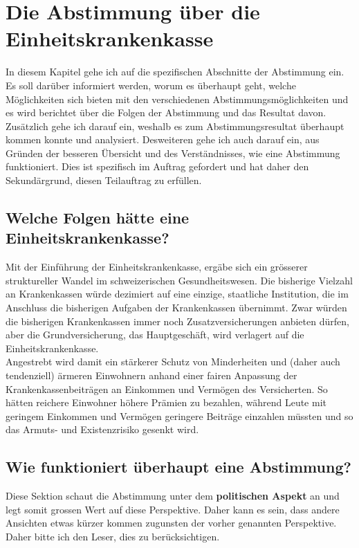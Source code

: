 \documentclass[a4paper,12pt]{book}
\begin{document}
\newpage

\chapter{Die Abstimmung über die Einheitskrankenkasse}
In diesem Kapitel gehe ich auf die spezifischen Abschnitte der Abstimmung ein. Es soll darüber informiert werden, worum es überhaupt geht, welche Möglichkeiten sich bieten mit den verschiedenen Abstimmungsmöglichkeiten und es wird berichtet über die Folgen der Abstimmung und das Resultat davon.\\
Zusätzlich gehe ich darauf ein, weshalb es zum Abstimmungsresultat überhaupt kommen konnte und analysiert. Desweiteren gehe ich auch darauf ein, aus Gründen der besseren Übersicht und des Verständnisses, wie eine Abstimmung funktioniert. Dies ist spezifisch im Auftrag gefordert und hat daher den Sekundärgrund, diesen Teilauftrag zu erfüllen.
\section{Welche Folgen hätte eine Einheitskrankenkasse?}
Mit der Einführung der Einheitskrankenkasse, ergäbe sich ein grösserer struktureller Wandel im schweizerischen Gesundheitswesen. Die bisherige Vielzahl an Krankenkassen würde dezimiert auf eine einzige, staatliche Institution, die im Anschluss die bisherigen Aufgaben der Krankenkassen übernimmt. Zwar würden die bisherigen Krankenkassen immer noch Zusatzversicherungen anbieten dürfen, aber die Grundversicherung, das Hauptgeschäft, wird verlagert auf die Einheitskrankenkasse.\\
Angestrebt wird damit ein stärkerer Schutz von Minderheiten und (daher auch tendenziell) ärmeren Einwohnern anhand einer fairen Anpassung der Krankenkassenbeiträgen an Einkommen und Vermögen des Versicherten. So hätten reichere Einwohner höhere Prämien zu bezahlen, während Leute mit geringem Einkommen und Vermögen geringere Beiträge einzahlen müssten und so das Armuts- und Existenzrisiko gesenkt wird.\\
\section{Wie funktioniert überhaupt eine Abstimmung?}
Diese Sektion schaut die Abstimmung unter dem \textbf{politischen Aspekt} an und legt somit grossen Wert auf diese Perspektive. Daher kann es sein, dass andere Ansichten etwas kürzer kommen zugunsten der vorher genannten Perspektive. Daher bitte ich den Leser, dies zu berücksichtigen.\\
\end{document}
